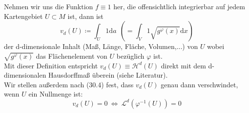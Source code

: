 Nehmen wir uns die Funktion $f\equiv 1$ her, 
die offensichtlich integrierbar auf jedem Kartengebiet $U\subset M$ ist, 
dann ist
\begin{equation}
	v_d(U)\coloneqq \int_U 1 \mathrm{d}a 
	\ \ \left( =\int_V 1 \sqrt{g^\varphi(x)}\mathrm{d}x\right)
\end{equation}
der d-dimensionale Inhalt (Maß, Länge, Fläche, Volumen,...) von $U$ 
wobei $\sqrt{g^\varphi(x)}$ das Flächenelement von $U$ bezüglich $\varphi$ ist.\\
Mit dieser Definition entspricht $v_d(U)\equiv\mathcal{H}^d(U)$ direkt 
mit dem d-dimensionalen Hausdorffmaß überein (siehe Literatur).\\
Wir stellen außerdem nach (30.4) fest, dass $v_d(U)$ genau dann verschwindet, 
wenn $U$ ein Nullmenge ist:
\begin{equation*}
	v_d(U)=0 \ \Leftrightarrow \ \mathcal{L}^d(\varphi^{-1}(U))=0
\end{equation*}

